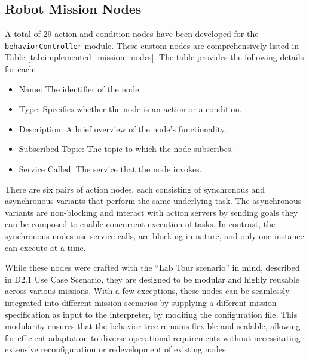 \documentclass{CSSRforAfrica}
\begin{document}
\newpage
\subsection{Robot Mission Nodes}

A total of \textnormal{29 action and condition nodes} have been developed for the \texttt{\small behaviorController} module. These custom nodes are comprehensively listed in \textnormal{Table \ref{tab:implemented_mission_nodes}}. The table provides the following details for each:

\begin{itemize}
    \item \textnormal{Name}: The identifier of the node.
    \item \textnormal{Type}: Specifies whether the node is an action or a condition.
    \item \textnormal{Description}: A brief overview of the node's functionality.
    \item \textnormal{Subscribed Topic}: The topic to which the node subscribes.
    \item \textnormal{Service Called}: The service that the node invokes.
\end{itemize}


There are six pairs of action nodes, each consisting of synchronous and asynchronous variants that perform the same underlying task. The asynchronous variants are non-blocking and interact with action servers by sending goals they can be composed to enable concurrent execution of tasks. In contrast, the synchronous nodes use service calls, are blocking in nature, and only one instance can execute at a time.

While these nodes were crafted with the ``Lab Tour scenario'' in mind, described in \textnormal{D2.1 Use Case Scenario}, they are designed to be \textnormal{modular and highly reusable} across various missions. With a few exceptions, these nodes can be seamlessly integrated into different mission scenarios by supplying a different mission specification as input to the interpreter, by modifing the configuration file. This modularity ensures that the behavior tree remains flexible and scalable, allowing for efficient adaptation to diverse operational requirements without necessitating extensive reconfiguration or redevelopment of existing nodes.
\end{document}

